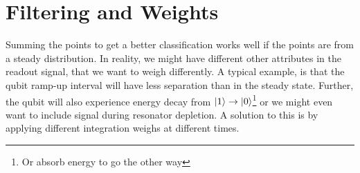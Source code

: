 


\section{Filtering and Weights}
Summing the points to get a better classification works well if the points are from a steady distribution. In reality, we might have different other attributes in the readout signal, that we want to weigh differently. A typical example, is that the qubit ramp-up interval will have less separation than in the steady state. Further, the qubit will also experience energy decay from $\ket{1}\to \ket{0}$\footnote{Or absorb energy to go the other way} or we might even want to include signal during resonator depletion. A solution to this is by applying different integration weighs at different times. 

